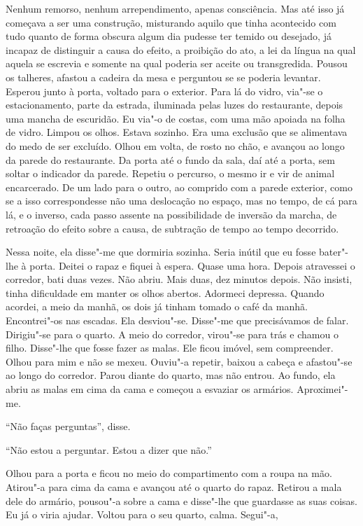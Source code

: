 Nenhum remorso, nenhum arrependimento, apenas consciência. Mas até isso
já começava a ser uma construção, misturando aquilo que tinha acontecido
com tudo quanto de forma obscura algum dia pudesse ter temido ou
desejado, já incapaz de distinguir a causa do efeito, a proibição do
ato, a lei da língua na qual aquela se escrevia e somente na qual
poderia ser aceite ou transgredida. Pousou os talheres, afastou a
cadeira da mesa e perguntou se se poderia levantar. Esperou junto à
porta, voltado para o exterior. Para lá do vidro, via"-se o
estacionamento, parte da estrada, iluminada pelas luzes do restaurante,
depois uma mancha de escuridão. Eu via"-o de costas, com uma mão apoiada
na folha de vidro. Limpou os olhos. Estava sozinho. Era uma exclusão que
se alimentava do medo de ser excluído. Olhou em volta, de rosto no chão,
e avançou ao longo da parede do restaurante. Da porta até o fundo da
sala, daí até a porta, sem soltar o indicador da parede. Repetiu o
percurso, o mesmo ir e vir de animal encarcerado. De um lado para o
outro, ao comprido com a parede exterior, como se a isso correspondesse
não uma deslocação no espaço, mas no tempo, de cá para lá, e o inverso,
cada passo assente na possibilidade de inversão da marcha, de retroação
do efeito sobre a causa, de subtração de tempo ao tempo decorrido.

Nessa noite, ela disse"-me que dormiria sozinha. Seria inútil que eu
fosse bater"-lhe à porta. Deitei o rapaz e fiquei à espera. Quase uma
hora. Depois atravessei o corredor, bati duas vezes. Não abriu. Mais
duas, dez minutos depois. Não insisti, tinha dificuldade em manter os
olhos abertos. Adormeci depressa. Quando acordei, a meio da manhã, os
dois já tinham tomado o café da manhã. Encontrei"-os nas escadas. Ela
desviou"-se. Disse"-me que precisávamos de falar. Dirigiu"-se para o
quarto. A meio do corredor, virou"-se para trás e chamou o filho.
Disse"-lhe que fosse fazer as malas. Ele ficou imóvel, sem compreender.
Olhou para mim e não se mexeu. Ouviu"-a repetir, baixou a cabeça e
afastou"-se ao longo do corredor. Parou diante do quarto, mas não
entrou. Ao fundo, ela abriu as malas em cima da cama e começou a
esvaziar os armários. Aproximei"-me.

``Não faças perguntas'',
disse.

``Não estou a perguntar. Estou a dizer que não.''

Olhou para a porta e ficou no meio do compartimento com a roupa na mão.
Atirou"-a para cima da cama e avançou até o quarto do rapaz. Retirou a
mala dele do armário, pousou"-a sobre a cama e disse"-lhe que guardasse
as suas coisas. Eu já o viria ajudar. Voltou para o seu quarto, calma.
Segui"-a,

